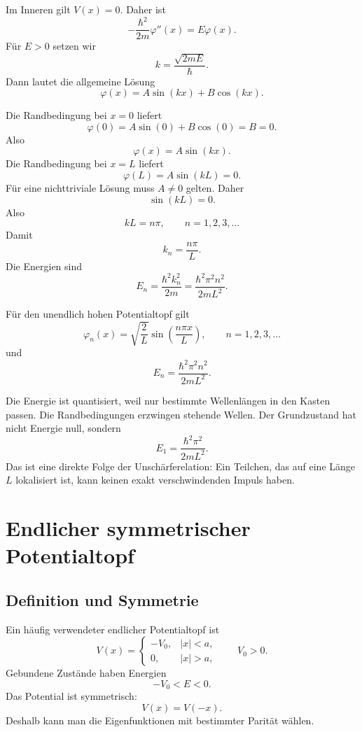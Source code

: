 Im Inneren gilt $V(x)=0$. Daher ist
\[
    -\frac{\hbar^2}{2m}\varphi''(x)=E\varphi(x).
\]
Für $E>0$ setzen wir
\[
    k=\frac{\sqrt{2mE}}{\hbar}.
\]
Dann lautet die allgemeine Lösung
\[
    \varphi(x)=A\sin(kx)+B\cos(kx).
\]

\begin{derivationbox}
Die Randbedingung bei $x=0$ liefert
\[
    \varphi(0)=A\sin(0)+B\cos(0)=B=0.
\]
Also
\[
    \varphi(x)=A\sin(kx).
\]
Die Randbedingung bei $x=L$ liefert
\[
    \varphi(L)=A\sin(kL)=0.
\]
Für eine nichttriviale Lösung muss $A\ne0$ gelten. Daher
\[
    \sin(kL)=0.
\]
Also
\[
    kL=n\pi,
    \qquad n=1,2,3,\dots
\]
Damit
\[
    k_n=\frac{n\pi}{L}.
\]
Die Energien sind
\[
    E_n=\frac{\hbar^2k_n^2}{2m}
    =\frac{\hbar^2\pi^2n^2}{2mL^2}.
\]
\end{derivationbox}

\begin{formulabox}
Für den unendlich hohen Potentialtopf gilt
\[
    \varphi_n(x)=\sqrt{\frac{2}{L}}\sin\left(\frac{n\pi x}{L}\right),
    \qquad n=1,2,3,\dots
\]
und
\[
    E_n=\frac{\hbar^2\pi^2n^2}{2mL^2}.
\]
\end{formulabox}

\begin{conceptbox}
Die Energie ist quantisiert, weil nur bestimmte Wellenlängen in den Kasten passen. Die Randbedingungen erzwingen stehende Wellen. Der Grundzustand hat nicht Energie null, sondern
\[
    E_1=\frac{\hbar^2\pi^2}{2mL^2}.
\]
Das ist eine direkte Folge der Unschärferelation: Ein Teilchen, das auf eine Länge $L$ lokalisiert ist, kann keinen exakt verschwindenden Impuls haben.
\end{conceptbox}

\section{Endlicher symmetrischer Potentialtopf}

\subsection{Definition und Symmetrie}

Ein häufig verwendeter endlicher Potentialtopf ist
\[
    V(x)=
    \begin{cases}
        -V_0, & |x|<a,\\
        0, & |x|>a,
    \end{cases}
    \qquad V_0>0.
\]
Gebundene Zustände haben Energien
\[
    -V_0<E<0.
\]
Das Potential ist symmetrisch:
\[
    V(x)=V(-x).
\]
Deshalb kann man die Eigenfunktionen mit bestimmter Parität wählen.

